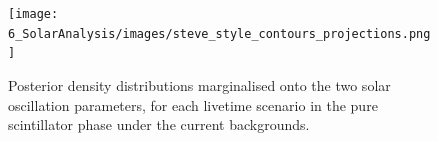 \begin{figure}[!th]
    \centering
    \texttt{[image: 6\_SolarAnalysis/images/steve\_style\_contours\_projections.png]}
    \caption[Posterior density posterior distributions marginalised onto the two solar oscillation parameters, for each livetime scenario]
    {Posterior density distributions marginalised onto the two solar oscillation parameters, for each livetime scenario in the pure scintillator phase under the current backgrounds.}
    \label{fig:2d_posteriors_projections}
\end{figure}



